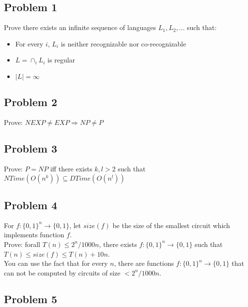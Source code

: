 \documentclass[11pt]{article}
\begin{document}

\subsection*{Problem 1}

Prove there exists an infinite sequence of languages $L_1, L_2, ...$ such that:

\begin{itemize}
  \item For every  $i$, $L_i$ is neither recognizable nor co-recognizable
  \item $L = \cap_i L_i$ is regular
  \item $|L| = \infty$
\end{itemize}

\newpage
\subsection*{Problem 2}

Prove: $NEXP \neq EXP \Rightarrow NP \neq P$

\newpage
\subsection*{Problem 3}

Prove: $P = NP$ iff there exists $k,l > 2$ such that $NTime(O(n^k)) \subseteq DTime(O(n^l))$

\newpage
\subsection*{Problem 4}

For $f: \{0,1\}^n \rightarrow \{0,1\}$, let $size(f)$
be the size of the smallest circuit which implements function $f$.\\

\noindent Prove: forall $T(n) \leq 2^n/1000n$, there exists $f:\{0,1\}^n \rightarrow \{0,1\}$ such that $T(n) \leq size(f) \leq T(n) + 10n$.\\


\noindent You can use the fact that for every $n$, there are functions $f:\{0,1\}^n \rightarrow \{0,1\}$ that
can not be computed by circuits of size $< 2^n / 1000n$.


\newpage
\subsection*{Problem 5}
\end{document}
